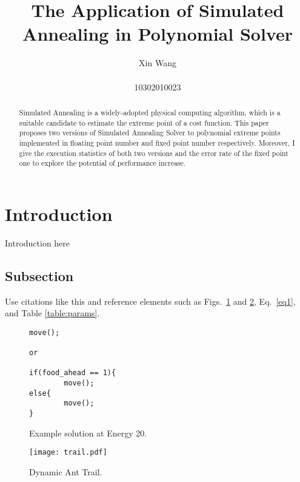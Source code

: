 \documentclass{article}[]
\begin{document}
\title{{\bf The Application of Simulated Annealing in Polynomial Solver}\\ }

\author{Xin Wang\\ \vspace{0.5cm}\\
 10302010023}

\date{}
\maketitle
\begin{abstract}
Simulated Annealing is a widely-adopted physical computing algorithm, which is a suitable candidate to estimate the extreme point of a cost function. This paper proposes two versions of Simulated Annealing Solver to polynomial extreme points implemented in floating point number and fixed point number respectively. Moreover, I give the execution statistics of both two versions and the error rate of the fixed point one to explore the potential of performance increase.
\end{abstract}

\section{Introduction}
\label{intro}
Introduction here

\subsection{Subsection}

Use citations like this \cite{Mckay:2010} and reference elements such as
Figs.~\ref{code:ant20} and \ref{fig:trail}, Eq.~\ref{eq1}, and Table
\ref{table:params}.

\begin{figure}
\centering
\begin{verbatim}
move();

or

if(food_ahead == 1){
        move();
else{
        move();
}
\end{verbatim}
\caption{Example solution at Energy 20.}%
\label{code:ant20}%
\end{figure}

\begin{figure}
\centering
\texttt{[image: trail.pdf]}
\caption{Dynamic Ant Trail.}
\label{fig:trail}
\end{figure}
\end{document}

